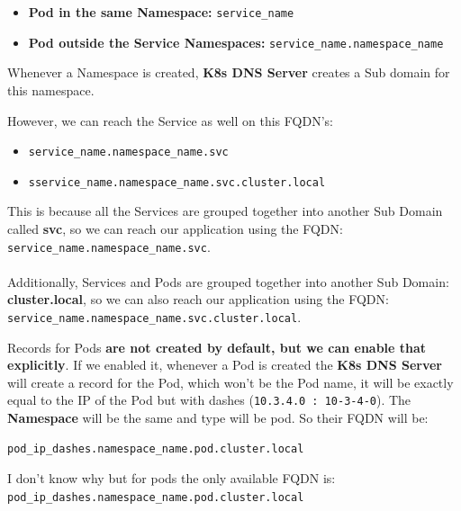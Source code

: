 \documentclass{article}
\newenvironment{blocktemplate}[1]{%
    \tcolorbox[beamer,%
    noparskip,breakable,
    colframe=Blue,%
    colbacklower=LimeGreen!75!LightGreen,%
    title=#1]}%
    {\endtcolorbox}
\newenvironment{blocktemplateIII}[1]{%
    \tcolorbox[beamer,%
    noparskip,breakable,
    ,colframe=Red,%
    colbacklower=LimeGreen!75!LightGreen,%
    title=#1]}%
    {\endtcolorbox}
\newenvironment{codetemplate}[1][]{%
  \mybasecolorbox[#1]
  \itshape
}{%
  \endmybasecolorbox
}
\begin{document}
\begin{itemize}
    \item \textbf{Pod in the same Namespace:} \verb|service_name|
    \item \textbf{Pod outside the Service Namespaces:} \verb|service_name.namespace_name|
\end{itemize}

Whenever a Namespace is created, \textbf{K8s DNS Server} creates a Sub domain for this namespace. 


\begin{blocktemplate}{NOTE}
However, we can reach the Service as well on this FQDN's:
\begin{itemize}
    \item \verb|service_name.namespace_name.svc|
    \item \verb|sservice_name.namespace_name.svc.cluster.local|
\end{itemize}

This is because all the Services are grouped together into another Sub Domain called \textbf{svc}, 
so we can reach our application using the FQDN: \verb|service_name.namespace_name.svc|. 
\\\\
Additionally, Services and Pods are grouped together into another Sub Domain: \textbf{cluster.local}, 
so we can also reach our application using the FQDN:
\verb|service_name.namespace_name.svc.cluster.local|.
\end{blocktemplate}

Records for Pods \textbf{are not created by default, but we can enable that explicitly}. 
If we enabled it, whenever a Pod is created the \textbf{K8s DNS Server} will create 
a record for the Pod, which won't be the Pod name, it will be exactly equal to the IP 
of the Pod but with dashes (\verb|10.3.4.0 : 10-3-4-0|). 
The \textbf{Namespace} will be the same and type will be pod. So their FQDN will be: 
\begin{codetemplate}{}
\begin{verbatim}
pod_ip_dashes.namespace_name.pod.cluster.local
\end{verbatim}
\end{codetemplate}

\begin{blocktemplateIII}{WARNING}
I don't know why but for pods the only available FQDN is: \verb|pod_ip_dashes.namespace_name.pod.cluster.local|
\end{blocktemplateIII}
\end{document}

